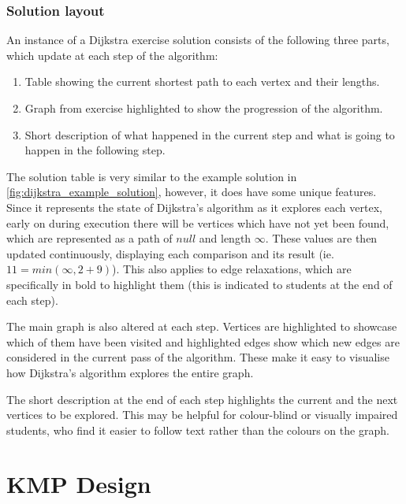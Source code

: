 \documentclass{l4proj}
\begin{document}
\subsection{Solution layout}

An instance of a Dijkstra exercise solution consists of the following three parts, which update at each step of the algorithm:

\begin{enumerate}
	\item
	Table showing the current shortest path to each vertex and their lengths.
	\item
	Graph from exercise highlighted to show the progression of the algorithm.
	\item
	Short description of what happened in the current step and what is going to happen in the following step.
\end{enumerate}

The solution table is very similar to the example solution in \autoref{fig:dijkstra_example_solution}, however, it does have some unique features. Since it represents the state of Dijkstra's algorithm as it explores each vertex, early on during execution there will be vertices which have not yet been found, which are represented as a path of $null$ and length $\infty$. These values are then updated continuously, displaying each comparison and its result (ie. $11 = min(\infty, 2+9)$). This also applies to edge relaxations, which are specifically in bold to highlight them (this is indicated to students at the end of each step).

The main graph is also altered at each step. Vertices are highlighted to showcase which of them have been visited and highlighted edges show which new edges are considered in the current pass of the algorithm. These make it easy to visualise how Dijkstra's algorithm explores the entire graph.

The short description at the end of each step highlights the current and the next vertices to be explored. This may be helpful for colour-blind or visually impaired students, who find it easier to follow text rather than the colours on the graph.


\chapter{KMP Design}
\end{document}
